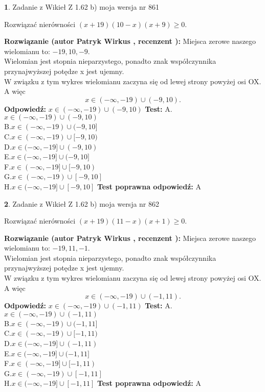 \documentclass[12pt, a4paper]{article}
\theoremstyle{definition} %
\newtheorem{zad}{}
\newcommand{\zadStart}[1]{\begin{zad}#1\newline}
\newcommand{\zadStop}{\end{zad}}
\newcommand{\rozwStart}[2]{\noindent \textbf{Rozwiązanie (autor #1 , recenzent #2): }\newline}
\newcommand{\rozwStop}{\newline}
\newcommand{\odpStart}{\noindent \textbf{Odpowiedź:}\newline}
\newcommand{\odpStop}{\newline}
\newcommand{\testStart}{\noindent \textbf{Test:}\newline}
\newcommand{\testStop}{\newline}
\newcommand{\kluczStart}{\noindent \textbf{Test poprawna odpowiedź:}\newline}
\newcommand{\kluczStop}{\newline}
\begin{document}
\zadStart{Zadanie z Wikieł Z 1.62 b) moja wersja nr 861}

Rozwiązać nierówności $(x+19)(10-x)(x+9)\ge0$.
\zadStop
\rozwStart{Patryk Wirkus}{}
Miejsca zerowe naszego wielomianu to: $-19, 10, -9$.\\
Wielomian jest stopnia nieparzystego, ponadto znak współczynnika przy\linebreak najwyższej potędze x jest ujemny.\\ W związku z tym wykres wielomianu zaczyna się od lewej strony powyżej osi OX. A więc $$x \in (-\infty,-19) \cup (-9,10).$$
\rozwStop
\odpStart
$x \in (-\infty,-19) \cup (-9,10)$
\odpStop
\testStart
A.$x \in (-\infty,-19) \cup (-9,10)$\\
B.$x \in (-\infty,-19) \cup (-9,10]$\\
C.$x \in (-\infty,-19) \cup [-9,10)$\\
D.$x \in (-\infty,-19] \cup (-9,10)$\\
E.$x \in (-\infty,-19] \cup (-9,10]$\\
F.$x \in (-\infty,-19] \cup [-9,10)$\\
G.$x \in (-\infty,-19) \cup [-9,10]$\\
H.$x \in (-\infty,-19] \cup [-9,10]$
\testStop
\kluczStart
A
\kluczStop



\zadStart{Zadanie z Wikieł Z 1.62 b) moja wersja nr 862}

Rozwiązać nierówności $(x+19)(11-x)(x+1)\ge0$.
\zadStop
\rozwStart{Patryk Wirkus}{}
Miejsca zerowe naszego wielomianu to: $-19, 11, -1$.\\
Wielomian jest stopnia nieparzystego, ponadto znak współczynnika przy\linebreak najwyższej potędze x jest ujemny.\\ W związku z tym wykres wielomianu zaczyna się od lewej strony powyżej osi OX. A więc $$x \in (-\infty,-19) \cup (-1,11).$$
\rozwStop
\odpStart
$x \in (-\infty,-19) \cup (-1,11)$
\odpStop
\testStart
A.$x \in (-\infty,-19) \cup (-1,11)$\\
B.$x \in (-\infty,-19) \cup (-1,11]$\\
C.$x \in (-\infty,-19) \cup [-1,11)$\\
D.$x \in (-\infty,-19] \cup (-1,11)$\\
E.$x \in (-\infty,-19] \cup (-1,11]$\\
F.$x \in (-\infty,-19] \cup [-1,11)$\\
G.$x \in (-\infty,-19) \cup [-1,11]$\\
H.$x \in (-\infty,-19] \cup [-1,11]$
\testStop
\kluczStart
A
\kluczStop
\end{document}
